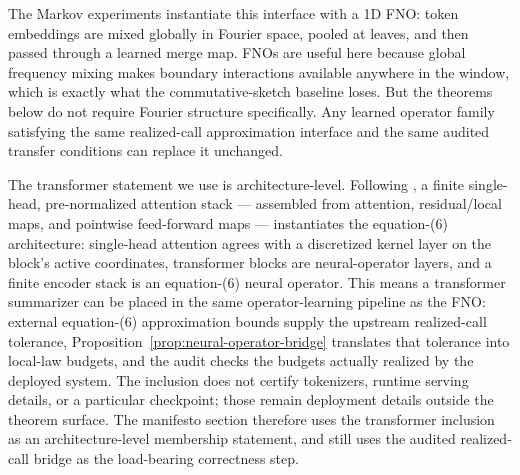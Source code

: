 The Markov experiments instantiate this interface with a 1D FNO: token
embeddings are mixed globally in Fourier space, pooled at leaves, and
then passed through a learned merge map. FNOs are useful here because
global frequency mixing makes boundary interactions available anywhere in
the window, which is exactly what the commutative-sketch baseline loses.
But the theorems below do not require Fourier structure specifically.
Any learned operator family satisfying the same realized-call
approximation interface and the same audited transfer conditions can
replace it unchanged.

The transformer statement we use is architecture-level. Following
\citet[Proposition~6]{Kovachki23NeuralOperator}, a finite
single-head, pre-normalized attention stack --- assembled from
attention, residual/local maps, and pointwise feed-forward maps ---
instantiates the equation-(6) architecture: single-head attention
agrees with a discretized kernel layer on the block's active
coordinates, transformer blocks are neural-operator layers, and a
finite encoder stack is an equation-(6) neural operator. This means a
transformer summarizer can be placed in the same operator-learning
pipeline as the FNO: external equation-(6) approximation bounds supply
the upstream realized-call tolerance, Proposition~\ref{prop:neural-operator-bridge}
translates that tolerance into local-law budgets, and the audit checks
the budgets actually realized by the deployed system. The inclusion
does not certify tokenizers, runtime serving details, or a particular
checkpoint; those remain deployment details outside the theorem
surface. The manifesto section therefore uses the transformer
inclusion as an architecture-level membership statement, and still uses
the audited realized-call bridge as the load-bearing correctness step.
